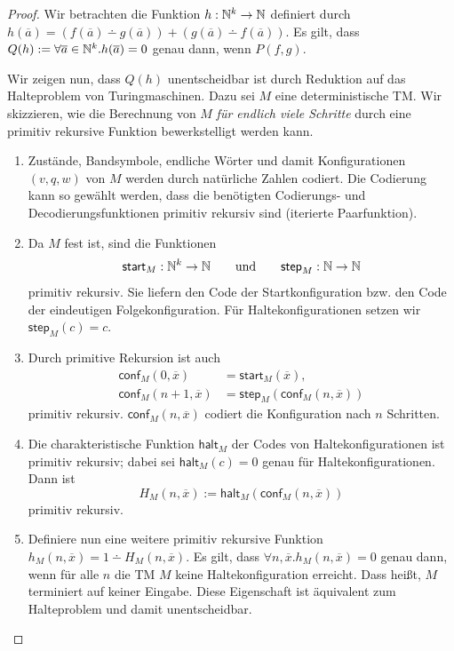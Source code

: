 \begin{proof}
  Wir betrachten die Funktion $h: \mathbb{N}^k \to \mathbb{N}$ definiert durch
  $h (\overline{a}) = (f (\overline{a}) \dotminus g (\overline{a})) +
  (g (\overline{a}) \dotminus f (\overline{a})) $.
  Es gilt, dass $Q(h) := \forall \overline{a}\in\mathbb{N}^k. h (\overline{a}) = 0$ genau dann, wenn
  $P (f,g )$.

  Wir zeigen nun, dass $Q(h)$ unentscheidbar ist durch Reduktion auf das Halteproblem
  von Turingmaschinen. Dazu  sei $M$ eine deterministische \ac{TM}. Wir skizzieren,
  wie die Berechnung von $M$ \emph{für endlich viele Schritte} durch eine primitiv rekursive
  Funktion bewerkstelligt werden kann.
  \begin{enumerate}
  \item Zustände, Bandsymbole, endliche Wörter und damit Konfigurationen
    $(v,q,w)$ von $M$ werden durch natürliche Zahlen codiert. Die Codierung
    kann so gewählt werden, dass die benötigten Codierungs- und
    Decodierungsfunktionen primitiv rekursiv sind (iterierte Paarfunktion).
  \item Da $M$ fest ist, sind die Funktionen
    \[
      \mathsf{start}_{M}:\N^k\->\N
      \qquad\text{und}\qquad
      \mathsf{step}_{M}:\N\->\N
    \]
    primitiv rekursiv. Sie liefern den Code der Startkonfiguration bzw. den
    Code der eindeutigen Folgekonfiguration. Für Haltekonfigurationen setzen
    wir $\mathsf{step}_{M}(c)=c$.
  \item Durch primitive Rekursion ist auch
    \begin{align*}
      \mathsf{conf}_{M}(0,\overline{x})
      &=\mathsf{start}_{M}(\overline{x}),\\
      \mathsf{conf}_{M}(n+1,\overline{x})
      &=\mathsf{step}_{M}(\mathsf{conf}_{M}(n,\overline{x}))
    \end{align*}
    primitiv rekursiv. $\mathsf{conf}_{M}(n,\overline{x})$ codiert die
    Konfiguration nach $n$ Schritten.
  \item Die charakteristische Funktion $\mathsf{halt}_{M}$ der Codes von
    Haltekonfigurationen ist primitiv rekursiv; dabei sei
    $\mathsf{halt}_{M}(c)=0$ genau für Haltekonfigurationen. Dann ist
    \[
      H_{M}(n,\overline{x})
      :=\mathsf{halt}_{M}(\mathsf{conf}_{M}(n,\overline{x}))
    \]
    primitiv rekursiv.
  \item Definiere nun eine weitere primitiv rekursive Funktion
    $h_M (n, \overline{x}) = 1 \dotminus H_{M}(n,\overline{x})$. Es
    gilt, dass $\forall n, \overline{x}. h_M (n, \overline{x}) = 0$ 
    genau dann, wenn für alle $n$ die TM $M$ keine Haltekonfiguration erreicht.
    Dass heißt, $M$ terminiert auf keiner Eingabe.
    Diese Eigenschaft ist äquivalent zum Halteproblem und damit unentscheidbar.
  \end{enumerate}
  
  
\end{proof}

